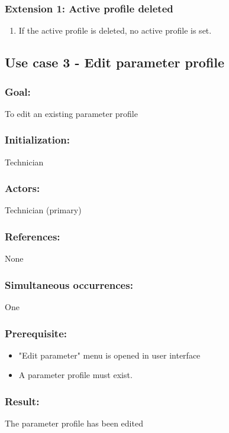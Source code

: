 \subsubsection*{Extension 1: Active profile deleted}
	\begin{enumerate}
		\item If the active profile is deleted, no active profile is set.
	\end{enumerate}


\subsection{Use case 3 - Edit parameter profile}
\subsubsection*{Goal:}
To edit an existing parameter profile 

\subsubsection*{Initialization:}
Technician

\subsubsection*{Actors:}
Technician (primary)

\subsubsection*{References:}
None

\subsubsection*{Simultaneous occurrences:}
One

\subsubsection*{Prerequisite:}
\begin{itemize}
\item "Edit parameter" menu is opened in user interface
\item A parameter profile must exist.
\end{itemize}


\subsubsection*{Result:}
The parameter profile has been edited

